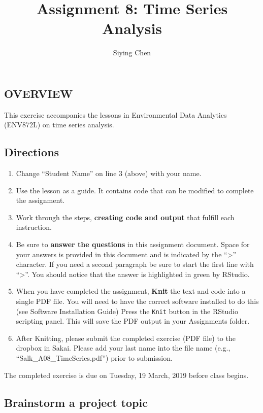 \documentclass[]{article}
\title{Assignment 8: Time Series Analysis}
\author{Siying Chen}
\date{}
\providecommand{\tightlist}{%
  \setlength{\itemsep}{0pt}\setlength{\parskip}{0pt}}
\begin{document}
\maketitle

\subsection{OVERVIEW}\label{overview}

This exercise accompanies the lessons in Environmental Data Analytics
(ENV872L) on time series analysis.

\subsection{Directions}\label{directions}

\begin{enumerate}
\def\labelenumi{\arabic{enumi}.}
\tightlist
\item
  Change ``Student Name'' on line 3 (above) with your name.
\item
  Use the lesson as a guide. It contains code that can be modified to
  complete the assignment.
\item
  Work through the steps, \textbf{creating code and output} that fulfill
  each instruction.
\item
  Be sure to \textbf{answer the questions} in this assignment document.
  Space for your answers is provided in this document and is indicated
  by the ``\textgreater{}'' character. If you need a second paragraph be
  sure to start the first line with ``\textgreater{}''. You should
  notice that the answer is highlighted in green by RStudio.
\item
  When you have completed the assignment, \textbf{Knit} the text and
  code into a single PDF file. You will need to have the correct
  software installed to do this (see Software Installation Guide) Press
  the \texttt{Knit} button in the RStudio scripting panel. This will
  save the PDF output in your Assignments folder.
\item
  After Knitting, please submit the completed exercise (PDF file) to the
  dropbox in Sakai. Please add your last name into the file name (e.g.,
  ``Salk\_A08\_TimeSeries.pdf'') prior to submission.
\end{enumerate}

The completed exercise is due on Tuesday, 19 March, 2019 before class
begins.

\subsection{Brainstorm a project
topic}\label{brainstorm-a-project-topic}
\end{document}
